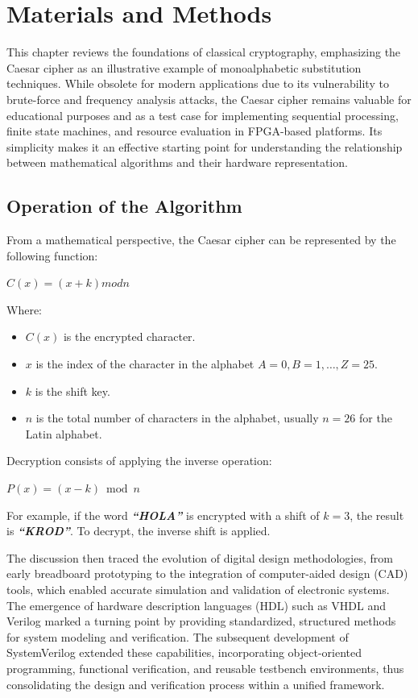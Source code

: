\documentclass[journal,article,submit,pdftex,moreauthors]{Definitions/mdpi}
\begin{document}
\section{Materials and Methods}

This chapter reviews the foundations of classical cryptography, emphasizing the Caesar cipher as an illustrative example of monoalphabetic substitution techniques. While obsolete for modern applications due to its vulnerability to brute-force and frequency analysis attacks, the Caesar cipher remains valuable for educational purposes and as a test case for implementing sequential processing, finite state machines, and resource evaluation in FPGA-based platforms. Its simplicity makes it an effective starting point for understanding the relationship between mathematical algorithms and their hardware representation.

\subsection{Operation of the Algorithm}
From a mathematical perspective, the Caesar cipher can be represented by the following function:
\centerline{\(C(x) = ( x + k ) mod n \)}

Where:

\begin{itemize}
\item $C(x)$ is the encrypted character.
\item $x$ is the index of the character in the alphabet $A = 0, B = 1, \dots, Z = 25$.
\item $k$ is the shift key.
\item $n$ is the total number of characters in the alphabet, usually $n = 26$ for the Latin alphabet.
\end{itemize}

Decryption consists of applying the inverse operation:

\centerline{$P(x) = ( x - k ) \bmod n $}

For example, if the word \textbf{\textit{“HOLA”}} is encrypted with a shift of $k = 3$, the result is \textbf{\textit{“KROD”}}. To decrypt, the inverse shift is applied.


The discussion then traced the evolution of digital design methodologies, from early breadboard prototyping to the integration of computer-aided design (CAD) tools, which enabled accurate simulation and validation of electronic systems. The emergence of hardware description languages (HDL) such as VHDL and Verilog marked a turning point by providing standardized, structured methods for system modeling and verification. The subsequent development of SystemVerilog extended these capabilities, incorporating object-oriented programming, functional verification, and reusable testbench environments, thus consolidating the design and verification process within a unified framework.
\end{document}
